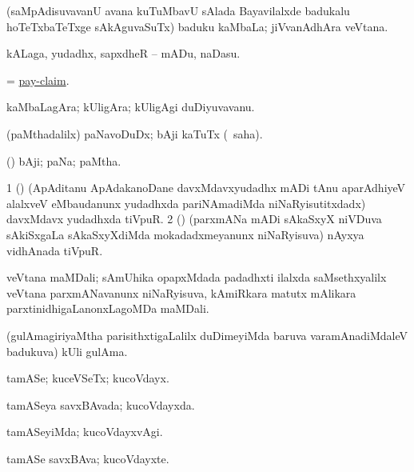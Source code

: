 \noindent 
\gl{\pagu}
\expl{}
\bmng
{} (saMpAdisuvavanU avana kuTuMbavU sAlada Bayavilalxde badukalu hoTeTxbaTeTxge sAkAguvaSuTx) baduku kaMbaLa; jiVvanAdhAra veVtana. 
\emng
\eentry

\bentry
{} 
\gl{\sakirx}
\expl{}
\bmng
kALaga, yudadhx, sapxdheR -- mADu, naDasu. 
\emng
\eentry

\bentry
{} 
\gl{\nA}
\expl{}
\bmng
= \hyperref{kandict_p.pdf}{P}{pay-claim}{pay-claim}. 
\emng
\eentry

\bentry
{} 
\gl{\nA}
\expl{}
\bmng
kaMbaLagAra; kUligAra; kUligAgi duDiyuvavanu. 
\emng
\eentry

\bentry
{} 
\gl{\sakirx}
\expl{}
\bmng
(paMthadalilx) paNavoDuDx; bAji kaTuTx (\akirx\ saha). 
\emng
\eentry

\bentry
{} 
\gl{\nA}
\expl{}
\bmng
(\ca) bAji; paNa; paMtha. 
\emng

\noindent 
\gl{\pagu}
\bmng
\bnum
\num{1}  (\ca) (ApAditanu ApAdakanoDane davxMdavxyudadhx mADi tAnu aparAdhiyeV alalxveV eMbaudanunx yudadhxda pariNAmadiMda niNaRyisutitxdadx) davxMdavx yudadhxda tiVpuR. 
\num{2}  (\ca) (parxmANa mADi sAkaSxyX niVDuva sAkiSxgaLa sAkaSxyXdiMda mokadadxmeyanunx niNaRyisuva) nAyxya vidhAnada tiVpuR. 
\enum
\emng
\eentry

\bentry
{}
\gl{\nA}
\expl{}
\bmng
veVtana maMDali; sAmUhika opapxMdada padadhxti ilalxda saMsethxyalilx veVtana parxmANavanunx niNaRyisuva, kAmiRkara matutx mAlikara parxtinidhigaLanonxLagoMDa maMDali. 
\emng
\eentry

\bentry
{}
\gl{\nA}
\expl{}
\bmng
(gulAmagiriyaMtha parisithxtigaLalilx duDimeyiMda baruva varamAnadiMdaleV badukuva) kUli gulAma. 
\emng
\eentry

\bentry
{} 
\gl{\nA}
\bmng
 tamASe; kuceVSeTx; kucoVdayx. 
\emng
\eentry

\bentry
{} 
\gl{\gu}
\expl{}
\bmng
tamASeya savxBAvada; kucoVdayxda. 
\emng
\eentry

\bentry
{} 
\gl{\kirxvi}
\expl{}
\bmng
tamASeyiMda; kucoVdayxvAgi. 
\emng
\eentry

\bentry
{} 
\gl{\nA}
\expl{}
\bmng
tamASe savxBAva; kucoVdayxte. 
\emng
\eentry

